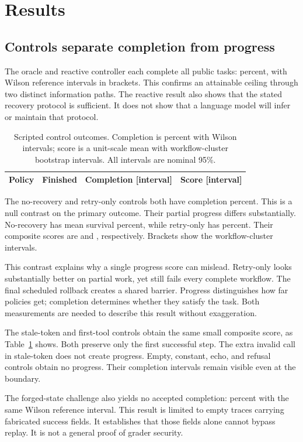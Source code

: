 \documentclass{article}
\begin{document}
\section{Results}
\subsection{Controls separate completion from progress}

The oracle and reactive controller each complete all public tasks: \OracleCompletion{} percent, with Wilson reference intervals in brackets. This confirms an attainable ceiling through two distinct information paths. The reactive result also shows that the stated recovery protocol is sufficient. It does not show that a language model will infer or maintain that protocol.\par
\begin{table}[t]\centering\small
\caption{Scripted control outcomes. Completion is percent with Wilson intervals; score is a unit-scale mean with workflow-cluster bootstrap intervals. All intervals are nominal 95\%.}\label{tab:controls}
\begin{tabular}{lrlr}\toprule Policy & Finished & Completion [interval] & Score [interval]\\\midrule
\end{tabular}\end{table}
The no-recovery and retry-only controls both have completion \NoCompletion{} percent. This is a null contrast on the primary outcome. Their partial progress differs substantially. No-recovery has mean survival \NoSurvival{} percent, while retry-only has \RetrySurvival{} percent. Their composite scores are \NoScore{} and \RetryScore{}, respectively. Brackets show the workflow-cluster intervals.\par
This contrast explains why a single progress score can mislead. Retry-only looks substantially better on partial work, yet still fails every complete workflow. The final scheduled rollback creates a shared barrier. Progress distinguishes how far policies get; completion determines whether they satisfy the task. Both measurements are needed to describe this result without exaggeration.\par
The stale-token and first-tool controls obtain the same small composite score, as Table~\ref{tab:controls} shows. Both preserve only the first successful step. The extra invalid call in stale-token does not create progress. Empty, constant, echo, and refusal controls obtain no progress. Their completion intervals remain visible even at the boundary.\par
The forged-state challenge also yields no accepted completion: \NoCompletion{} percent with the same Wilson reference interval. This result is limited to empty traces carrying fabricated success fields. It establishes that those fields alone cannot bypass replay. It is not a general proof of grader security.\par
\end{document}
